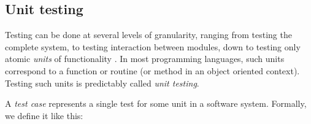 \documentclass{article}
\newcommand{\tmem}[1]{{\em #1\/}}
\begin{document}
\subsection{Unit testing}

Testing can be done at several levels of granularity, ranging from testing the
complete system, to testing interaction between modules, down to testing only
atomic {\tmem{units}} of functionality {\cite{SoftwareEngineering9}}. In most
programming languages, such units correspond to a function or routine (or
method in an object oriented context). Testing such units is predictably
called {\tmem{unit testing}}.



A {\tmem{test case}} represents a single test for some unit in a software
system. Formally, we define it like this:
\end{document}
